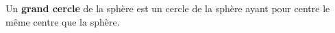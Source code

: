 
Un \textbf{grand cercle} de la sphère est un cercle de la sphère ayant pour centre le même centre que la sphère. 